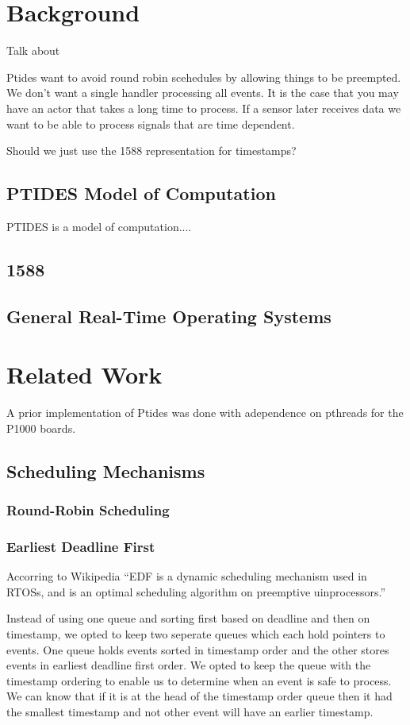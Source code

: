 \documentclass{sig-alternate}
\begin{document}
\section{Background}
Talk about 

Ptides want to avoid round robin scehedules by allowing things to be preempted. We don't want a single handler processing all events. It is the case that you may have an actor that takes a long time to process. If a sensor later receives data we want to be able to process signals that are time dependent.

Should we just use the 1588 representation for timestamps?

\subsection{PTIDES Model of Computation}
PTIDES is a \cite{ptidesTechReport} model of computation....

\subsection{1588}
\subsection{General Real-Time Operating Systems}



\section{Related Work}
A prior implementation of Ptides was done with adependence on pthreads for the P1000 boards.

\subsection{Scheduling Mechanisms}
\subsubsection{Round-Robin Scheduling}
\subsubsection{Earliest Deadline First}
Accorring to Wikipedia "`EDF is a dynamic scheduling mechanism used in RTOSs, and is an optimal scheduling algorithm on preemptive uinprocessors."'

Instead of using one queue and sorting first based on deadline and then on timestamp, we opted to keep two seperate queues which each hold pointers to events. One queue holds events sorted in timestamp order and the other stores events in earliest deadline first order. We opted to keep the queue with the timestamp ordering to enable us to determine when an event is safe to process. We can know that if it is at the head of the timestamp order queue then it had the smallest timestamp and not other event will have an earlier timestamp.
\end{document}
